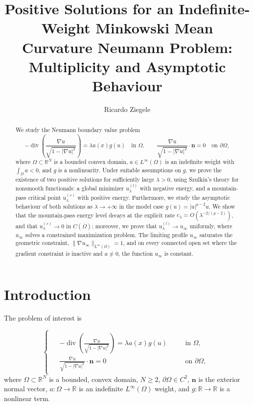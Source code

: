 \documentclass[11pt,reqno]{amsart}
\title[Minkowski mean curvature equation: The Neumann Problem]{Positive Solutions for an Indefinite-Weight Minkowski Mean Curvature Neumann Problem: Multiplicity and Asymptotic Behaviour}
\author[R. Ziegele]{Ricardo Ziegele}
\theoremstyle{plain}
\theoremstyle{definition}
\numberwithin{equation}{section}
\newcommand{\R}{\mathbb{R}}
\begin{document}

\maketitle

\begin{abstract}
We study the Neumann boundary value problem
$$
-\operatorname{div}\left(\frac{\nabla u}{\sqrt{1-|\nabla u|^2}}\right)
= \lambda a(x)g(u) \quad \text{in } \Omega, \qquad
\frac{\nabla u}{\sqrt{1-|\nabla u|^2}}\cdot \mathbf n = 0 \quad \text{on } \partial\Omega,
$$
where $\Omega \subset \mathbb R^N$ is a bounded convex domain, $a\in L^\infty(\Omega)$ is an indefinite weight with $\int_\Omega a < 0$, and $g$ is a nonlinearity. Under suitable assumptions on $g$, we prove the existence of two positive solutions for sufficiently large $\lambda>0$, using Szulkin's theory for nonsmooth functionals: a global minimizer $u_\lambda^{(l)}$ with negative energy, and a mountain-pass critical point $u_\lambda^{(s)}$ with positive energy. Furthermore, we study the asymptotic behaviour of both solutions as $\lambda \to +\infty$ in the model case $g(u) = |u|^{p-2} u$. We show that the mountain-pass energy level decays at the explicit rate $c_\lambda = O(\lambda^{-2/(p-2)})$, and that $u_\lambda^{(s)} \to 0$ in $C(\overline\Omega)$; moreover, we prove that $u_\lambda^{(l)} \to u_\infty$ uniformly, where $u_\infty$ solves a constrained maximization problem. The limiting profile $u_\infty$ saturates the geometric constraint, $\|\nabla u_\infty\|_{L^\infty(\Omega)}=1$, and on every connected open set where the gradient constraint is inactive and $a\neq 0$, the function $u_\infty$ is constant.
\end{abstract}

\tableofcontents

\section{Introduction}

The problem of interest is

\begin{equation}
\label{eq-general}
    \begin{cases}
        \begin{aligned}
            &-\operatorname{div}\left(\frac{\nabla u}{\sqrt{1-|\nabla u|^2}} \right) = \lambda a(x) g(u) \quad &&\text{in } \Omega, \\
            &\frac{\nabla u}{\sqrt{1-|\nabla u|^2}} \cdot \mathbf{ n} = 0 &&\text{on } \partial\Omega, 
        \end{aligned}
    \end{cases}
\end{equation}
where $\Omega \subset \mathbb{R}^N$ is a bounded, convex domain, $N \geq 2$, $\partial \Omega \in C^2$, $\mathbf{ n}$ is the exterior normal vector,  $a : \Omega \to \R$ is an indefinite $L^\infty(\Omega)$ weight,  and $g: \R \to \R$ is a nonlinear term. 
\end{document}
